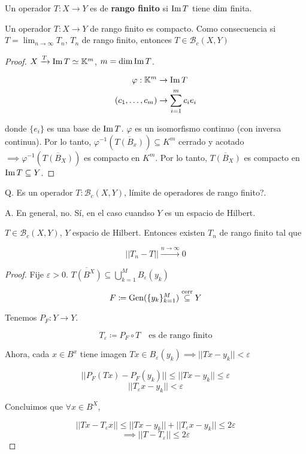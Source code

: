 \begin{fdefinition}
   Un operador $T:X\to Y$ es de \textbf{rango finito} si $\operatorname{Im} T$ tiene $\operatorname{dim}$ finita.
\end{fdefinition}

\begin{fproposition}
   Un operador $T:X\to Y$ de rango finito es compacto. Como consecuencia si $T=\lim_{n\to\infty}T_n$, $T_n$ de rango finito, entonces $T\in\mathcal{B}_c(X,Y)$
\end{fproposition}

\begin{proof}
   $X\xrightarrow{T}\operatorname{Im} T\simeq \mathbb{K}^m$, $m=\operatorname{dim} \operatorname{Im} T$.

   \begin{align*}
       \varphi:\mathbb{K}^m&\to\operatorname{Im} T\\
       (c_1,\ldots,c_m)&\to \sum_{i=1}^m c_ie_i
   \end{align*}

   donde $\{e_i\}$ es una base de $\operatorname{Im} T$. $\varphi$ es un isomorfismo continuo (con inversa continua). Por lo tanto, $\varphi^{-1}(\overline{T(B_x)})\subseteq K^m$ cerrado y acotado $\implies \varphi^{-1}(\overline{T(B_X)})$ es compacto en $K^m$. Por lo tanto, $\overline{T(B_X)}$ es compacto en $\operatorname{Im} T\subseteq Y$.
\end{proof}

Q. Es un operador $T:\mathcal{B}_c(X,Y)$, límite de operadores de rango finito?.

A. En general, no. Sí, en el caso cuandso $Y$ es un espacio de Hilbert.

\begin{ftheorem}
   $T\in \mathcal{B}_c(X,Y)$, $Y$ espacio de Hilbert. Entonces existen $T_n$ de rango finito tal que 

   \[||T_n-T||\xrightarrow{n\to\infty}0\]
\end{ftheorem}

\begin{proof}
   Fije $\varepsilon>0$. $\overline{T(B^X)}\subseteq \bigcup_{k=1}^M B_\varepsilon(y_k)$

   \[F\coloneqq \operatorname{Gen}(\{y_k\}_{k=1}^M)\overset{\text{cerr}}{\subseteq} Y\]

   Tenemos $P_F:Y\to Y$.

   \[T_\varepsilon\coloneqq P_F\circ T\quad\text{es de rango finito}\]

   Ahora, cada $x\in B^x$ tiene imagen $Tx\in B_\varepsilon(y_k)\implies ||Tx-y_k||<\varepsilon$

   \[||P_F(Tx)-P_F(y_k)||\leq ||Tx-y_k||\leq\varepsilon\]
   \[||T_\varepsilon x-y_k||<\varepsilon\]

   Concluimos que $\forall x\in B^X$,

   \[||Tx-T_\varepsilon x||\leq ||Tx-y_k||+||T_\varepsilon x-y_k||\leq 2\varepsilon\]
   \[\implies ||T-T_\varepsilon||\leq 2\varepsilon\]
\end{proof}

